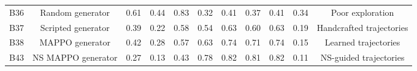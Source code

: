 \begin{table}[h!]
{\begin{tabular}{lcccccccccc}
            \midrule

            B36                      &
            Random generator         &
            0.61                     &
            0.44                     &
            0.83                     &
            0.32                     &
            0.41                     &
            0.37                     &
            0.41                     &
            0.34                     &
            Poor exploration
            \\

            B37                      &
            Scripted generator       &
            0.39                     &
            0.22                     &
            0.58                     &
            0.54                     &
            0.63                     &
            0.60                     &
            0.63                     &
            0.19                     &
            Handcrafted trajectories
            \\

            B38                      &
            MAPPO generator          &
            0.42                     &
            0.28                     &
            0.57                     &
            0.63                     &
            0.74                     &
            0.71                     &
            0.74                     &
            0.15                     &
            Learned trajectories
            \\

            B43                      &
            NS MAPPO generator       &
            0.27                     &
            0.13                     &
            0.43                     &
            0.78                     &
            0.82                     &
            0.81                     &
            0.82                     &
            0.11                     &
            NS-guided trajectories
            \\

            \bottomrule
        \end{tabular}
    }
\end{table}